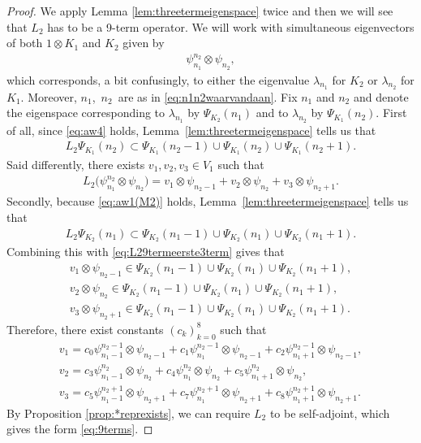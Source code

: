 \documentclass[pdftex]{sigma}
\numberwithin{equation}{section}
\begin{document}
\begin{proof}We apply Lemma \ref{lem:threetermeigenspace} twice and then we will see that $L_2$ has to be a 9-term operator. We will work with simultaneous eigenvectors of both $1\otimes K_1$ and $K_2$ given by
	\begin{gather*}
		\psi_{n_1}^{n_2}\otimes \psi_{n_2},
	\end{gather*}
	which corresponds, a bit confusingly, to either the eigenvalue $\lambda_{n_1}$ for $K_2$ or $\lambda_{n_2}$ for $K_1$. Moreover, $n_1$,~$n_2$~are as in \eqref{eq:n1n2waarvandaan}. Fix $n_1$ and $n_2$ and denote the eigenspace corresponding to $\lambda_{n_1}$ by $\Psi_{K_2}(n_1)$ and to $\lambda_{n_2}$ by $\Psi_{K_1}(n_2)$. First of all, since \eqref{eq:aw4} holds, Lemma~\ref{lem:threetermeigenspace} tells us that
	\begin{gather*}
		L_2 \Psi_{K_1}(n_2)\subset \Psi_{K_1}(n_2-1)\cup \Psi_{K_1}(n_2)\cup\Psi_{K_1}(n_2+1).
	\end{gather*}	
	Said differently, there exists $v_{1},v_2,v_3\in V_1$ such that
	\begin{gather}
		L_2 \big(\psi_{n_1}^{n_2}\otimes \psi_{n_2}\big)= v_1 \otimes \psi_{n_2-1}+v_2 \otimes \psi_{n_2}+v_3 \otimes \psi_{n_2+1}.\label{eq:L29termeerste3term}
	\end{gather}	
	Secondly, because \eqref{eq:aw1(M2)} holds, Lemma~\ref{lem:threetermeigenspace} tells us that
	\begin{gather*}
		L_2 \Psi_{K_2}(n_1)\subset \Psi_{K_2}(n_1-1)\cup \Psi_{K_2}(n_1)\cup\Psi_{K_2}(n_1+1).
	\end{gather*}	
	Combining this with \eqref{eq:L29termeerste3term} gives that
	\begin{gather*}
		v_1\otimes \psi_{n_2-1}\in \Psi_{K_2}(n_1-1)\cup \Psi_{K_2}(n_1)\cup\Psi_{K_2}(n_1+1),\\
		v_2\otimes \psi_{n_2} \in \Psi_{K_2}(n_1-1)\cup \Psi_{K_2}(n_1)\cup\Psi_{K_2}(n_1+1),\\
		v_3\otimes \psi_{n_2+1} \in \Psi_{K_2}(n_1-1)\cup \Psi_{K_2}(n_1)\cup\Psi_{K_2}(n_1+1).
	\end{gather*}
	Therefore, there exist constants $(c_k)_{k=0}^8$ such that
	\begin{gather*}
		v_1 = c_0 \psi_{n_1-1}^{n_2-1}\otimes \psi_{n_2-1} + c_1 \psi_{n_1}^{n_2-1}\otimes \psi_{n_2-1} +c_2 \psi_{n_1+1}^{n_2-1}\otimes \psi_{n_2-1},\\
		v_2 = c_3 \psi_{n_1-1}^{n_2}\otimes \psi_{n_2} + c_4 \psi_{n_1}^{n_2}\otimes \psi_{n_2} +c_5 \psi_{n_1+1}^{n_2}\otimes \psi_{n_2},\\
		v_3 = c_5 \psi_{n_1-1}^{n_2+1}\otimes \psi_{n_2+1} + c_7 \psi_{n_1}^{n_2+1}\otimes \psi_{n_2+1} +c_8 \psi_{n_1+1}^{n_2+1}\otimes \psi_{n_2+1}.
	\end{gather*}
	By Proposition \ref{prop:*reprexists}, we can require $L_2$ to be self-adjoint, which gives the form \eqref{eq:9terms}.
\end{proof}
\end{document}
